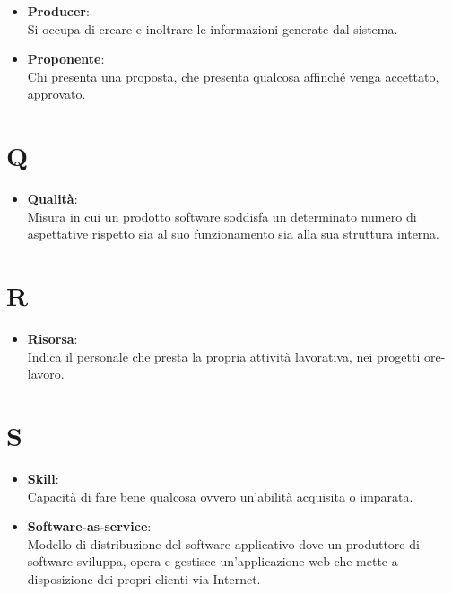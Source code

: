 \documentclass[a4paper, oneside, openany, dvipsnames, table]{article}
\begin{document}
\begin{itemize}
\item \textbf{Producer}:\\	Si occupa di creare e inoltrare le informazioni generate dal sistema.
\end{itemize}

\begin{itemize}
\item \textbf{Proponente}:\\	Chi presenta una proposta, che presenta qualcosa affinché venga accettato, approvato.
\end{itemize}

\newpage
\section{Q}
\begin{itemize}
\item \textbf{Qualità}:\\	Misura in cui un prodotto software soddisfa un determinato numero di aspettative rispetto sia al suo funzionamento sia alla sua struttura interna.
\end{itemize}

\newpage
\section{R}
\begin{itemize}
\item \textbf{Risorsa}:\\	Indica il personale che presta la propria attività lavorativa, nei progetti ore-lavoro.
\end{itemize}

\newpage
\section{S}
\begin{itemize}
\item \textbf{Skill}:\\	Capacità di fare bene qualcosa ovvero un'abilità acquisita o imparata.
\end{itemize}

\begin{itemize}
\item \textbf{Software-as-service}:\\	Modello di distribuzione del software applicativo dove un produttore di software sviluppa, opera e gestisce un'applicazione web che mette a disposizione dei propri clienti via Internet.
\end{itemize}
\end{document}
